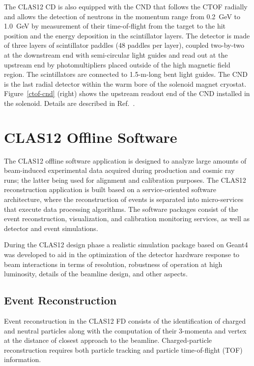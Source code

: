 \documentclass[final,3p,twocolumn]{elsarticle}
\begin{document}
The CLAS12 CD is also equipped with the CND that follows the CTOF radially and allows the detection of neutrons
in the momentum range from 0.2~GeV to 1.0~GeV by measurement of their time-of-flight from the target to the
hit position and the energy deposition in the scintillator layers. The detector is made of three layers of scintillator
paddles (48 paddles per layer), coupled two-by-two at the downstream end with semi-circular light guides and
read out at the upstream end by photomultipliers placed outside of the high magnetic field region. The scintillators
are connected to 1.5-m-long bent light guides. The CND is the last radial detector within the warm bore of the
solenoid magnet cryostat.  Figure~\ref{ctof-cnd} (right) shows the upstream readout end of the CND installed in
the solenoid. Details are described in Ref.~\cite{cnd-nim}.

\section{CLAS12 Offline Software}  

The CLAS12 offline software application is designed to analyze large amounts of beam-induced experimental data
acquired during production and cosmic ray runs; the latter being used for alignment and calibration purposes. The
CLAS12 reconstruction application is built based on a service-oriented software architecture, where the
reconstruction of events is separated into micro-services that execute data processing algorithms. The software
packages consist of the event reconstruction, visualization, and calibration monitoring services, as well as detector
and event simulations. 

During the CLAS12 design phase a realistic simulation package based on Geant4 was developed to aid in the
optimization of the detector hardware response to beam interactions in terms of resolution, robustness of operation
at high luminosity, details of the beamline design, and other aspects. 

\subsection{Event Reconstruction} 

Event reconstruction in the CLAS12 FD consists of the identification of charged and neutral particles along with the 
computation of their 3-momenta and vertex at the distance of closest approach to the beamline. Charged-particle
reconstruction requires both particle tracking and particle time-of-flight (TOF) information. 
\end{document}
